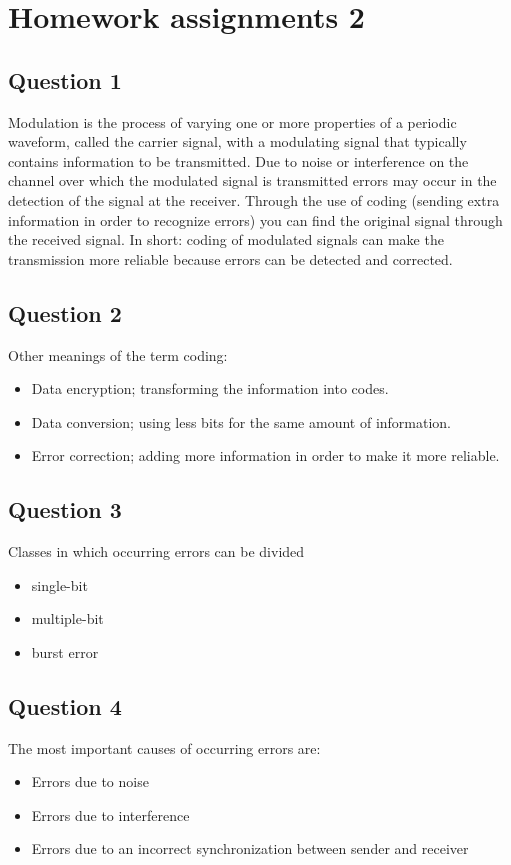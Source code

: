 \documentclass[final]{scrreprt} %
\begin{document}
\section{Homework assignments 2}
\label{sec:homework2}
\subsection{Question 1}
Modulation is the process of varying one or more properties of a periodic waveform, called the carrier signal, with a modulating signal that typically contains information to be transmitted.
Due to noise or interference on the channel over which the modulated signal is transmitted errors may occur in the detection of the signal at the receiver. Through the use of coding (sending extra information in order to recognize errors) you can find the original signal through the received signal. 
In short: coding of modulated signals can make the transmission more reliable because errors can be detected and corrected. 
\subsection{Question 2}
Other meanings of the term coding:
\begin{itemize}
\item Data encryption; transforming the information into codes.
\item Data conversion;  using less bits for the same amount of information.
\item Error correction; adding more information in order to make it more reliable.
\end{itemize}
\subsection{Question 3}
Classes in which occurring errors can be divided
\begin{itemize}
\item single-bit
\item multiple-bit
\item burst error
\end{itemize}
\subsection{Question 4}
The most important causes of occurring errors are:
\begin{itemize}
\item Errors due to noise
\item Errors due to interference
\item Errors due to an incorrect synchronization between sender and receiver
\end{itemize}
\end{document}
